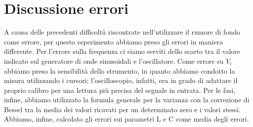 \section{Discussione errori}
\label{discussione errori}
A causa delle precedenti difficoltà riscontrate nell’utilizzare il rumore di fondo come errore, per questo esperimento abbiamo preso gli errori in maniera differente.
Per l’errore sulla frequenza ci siamo serviti dello scarto tra il valore indicato sul generatore di onde sinusoidali e l’oscillatore.
Come errore su $V_{i}$ abbiamo preso la sensibilità dello strumento, in quanto abbiamo condotto la misura utilizzando i cursori; l’oscilloscopio, infatti, era in grado di adattare il proprio calibro per una lettura più precisa del segnale in entrata. Per le fasi, infine, abbiamo utilizzato la formula generale per la varianza con la correzione di Bessel tra la media dei valori ricavati per un determinato zero e i valori stessi.
Abbiamo, infine, calcolato gli errori sui parametri L e C come media degli errori.

